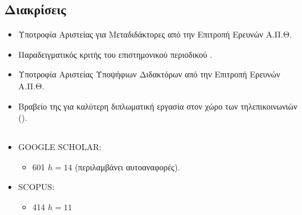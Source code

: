 \documentclass[11pt]{article}
\begin{document}
\subsection{Διακρίσεις}
\begin{itemize}

\item \greektext Υποτροφία Αριστείας για Μεταδιδάκτορες από την Επιτροπή Ερευνών Α.Π.Θ.

\item Παραδειγματικός κριτής του επιστημονικού περιοδικού .

\item \greektext Υποτροφία Αριστείας Υποψήφιων Διδακτόρων από την Επιτροπή Ερευνών Α.Π.Θ.

\item Βραβείο της  \greektext για καλύτερη διπλωματική εργασία στον χώρο των τηλεπικοινωνιών ().

\end{itemize}

\subsection{}
\begin{itemize}\greektext

\item \latintext GOOGLE SCHOLAR:
\begin{itemize}
    \item 601  $h=14$ (\greektext περιλαμβάνει αυτοαναφορές).
\end{itemize}

\item \latintext SCOPUS:
\begin{itemize}
\item  414  $h=11$
\end{itemize}
\end{itemize}
\section{}
\end{document}
